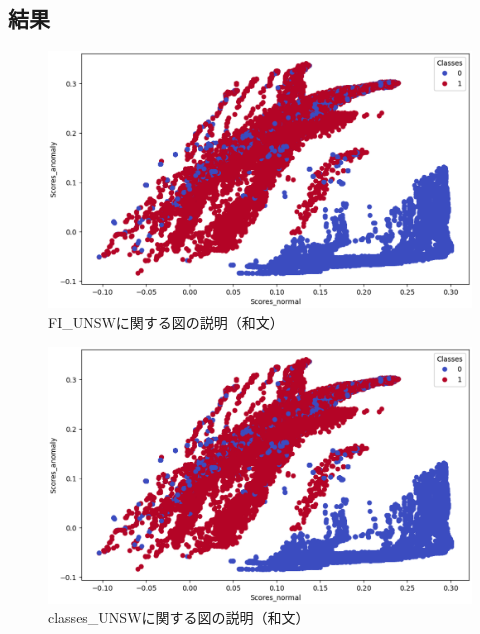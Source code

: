 \documentclass{css}
\begin{document}
\subsection{結果}

\begin{figure}[tb]
    \centering
    \includegraphics[width=\linewidth]{pictures/eps/classes_UNSW.eps}
    \caption{FI\_UNSWに関する図の説明（和文）}
    \label{fig:FI_UNSW}
\end{figure}

\begin{figure}[tb]
    \centering
    \includegraphics[width=\linewidth]{pictures/eps/classes_UNSW.eps}
    \caption{classes\_UNSWに関する図の説明（和文）}
    \label{fig:classes_UNSW}
\end{figure}
\end{document}
